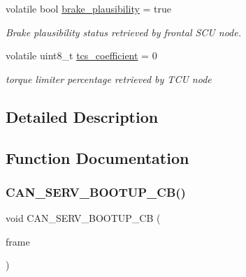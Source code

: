 \begin{DoxyCompactItemize}
\mbox{\label{group___c_a_n__servizi__group_gae505d69d6ac9d4e7e3c2268ca6cb20b3}} 
volatile bool \mbox{\hyperlink{group___c_a_n__servizi__group_gae505d69d6ac9d4e7e3c2268ca6cb20b3}{brake\+\_\+plausibility}} = true
\begin{DoxyCompactList}\small\item\em Brake plausibility status retrieved by frontal S\+CU node. \end{DoxyCompactList}\item 
\mbox{\label{group___c_a_n__servizi__group_gac6f04deffa2553115dad7c8b45e14d8b}} 
volatile uint8\+\_\+t \mbox{\hyperlink{group___c_a_n__servizi__group_gac6f04deffa2553115dad7c8b45e14d8b}{tcs\+\_\+coefficient}} = 0
\begin{DoxyCompactList}\small\item\em torque limiter percentage retrieved by T\+CU node \end{DoxyCompactList}\end{DoxyCompactItemize}


\subsection{Detailed Description}


\subsection{Function Documentation}
\mbox{\label{group___c_a_n__servizi__group_gaab9a1dbabaf97e474f5597e8b2a02c6e}} 
\subsubsection{\texorpdfstring{C\+A\+N\+\_\+\+S\+E\+R\+V\+\_\+\+B\+O\+O\+T\+U\+P\+\_\+\+C\+B()}{CAN\_SERV\_BOOTUP\_CB()}}
{\footnotesize\ttfamily void C\+A\+N\+\_\+\+S\+E\+R\+V\+\_\+\+B\+O\+O\+T\+U\+P\+\_\+\+CB (\begin{DoxyParamCaption}\item[{C\+A\+N\+\_\+\+F\+R\+A\+ME $\ast$}]{frame }\end{DoxyParamCaption})}



